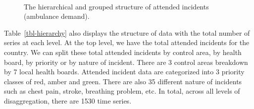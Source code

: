 \documentclass[
  authoryear,
  preprint,
  3p]{elsarticle}
\begin{document}
\begin{figure}

\begin{minipage}[t]{0.56\linewidth}

{\centering 


}

\end{minipage}%
%
\begin{minipage}[t]{0.02\linewidth}

{\centering 

~

}

\end{minipage}%
%
\begin{minipage}[t]{0.42\linewidth}

{\centering 


}

\end{minipage}%

\caption{\label{fig-hierarchy}The hierarchical and grouped structure of
attended incidents (ambulance demand).}

\end{figure}

Table~\ref{tbl-hierarchy} also displays the structure of data with the
total number of series at each level. At the top level, we have the
total attended incidents for the country. We can split these total
attended incidents by control area, by health board, by priority or by
nature of incident. There are 3 control areas breakdown by 7 local
health boards. Attended incident data are categorized into 3 priority
classes of red, amber and green. There are also 35 different nature of
incidents such as chest pain, stroke, breathing problem, etc. In total,
across all levels of disaggregation, there are 1530 time series.
\end{document}
